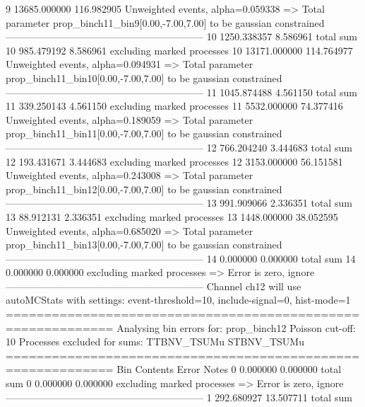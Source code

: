 9          13685.000000    116.982905      Unweighted events, alpha=0.059338
  => Total parameter prop_binch11_bin9[0.00,-7.00,7.00] to be gaussian constrained
------------------------------------------------------------
10         1250.338357     8.586961        total sum                     
10         985.479192      8.586961        excluding marked processes    
10         13171.000000    114.764977      Unweighted events, alpha=0.094931
  => Total parameter prop_binch11_bin10[0.00,-7.00,7.00] to be gaussian constrained
------------------------------------------------------------
11         1045.874488     4.561150        total sum                     
11         339.250143      4.561150        excluding marked processes    
11         5532.000000     74.377416       Unweighted events, alpha=0.189059
  => Total parameter prop_binch11_bin11[0.00,-7.00,7.00] to be gaussian constrained
------------------------------------------------------------
12         766.204240      3.444683        total sum                     
12         193.431671      3.444683        excluding marked processes    
12         3153.000000     56.151581       Unweighted events, alpha=0.243008
  => Total parameter prop_binch11_bin12[0.00,-7.00,7.00] to be gaussian constrained
------------------------------------------------------------
13         991.909066      2.336351        total sum                     
13         88.912131       2.336351        excluding marked processes    
13         1448.000000     38.052595       Unweighted events, alpha=0.685020
  => Total parameter prop_binch11_bin13[0.00,-7.00,7.00] to be gaussian constrained
------------------------------------------------------------
14         0.000000        0.000000        total sum                     
14         0.000000        0.000000        excluding marked processes    
  => Error is zero, ignore      
------------------------------------------------------------
Channel ch12 will use autoMCStats with settings: event-threshold=10, include-signal=0, hist-mode=1
============================================================
Analysing bin errors for: prop_binch12
Poisson cut-off: 10
Processes excluded for sums: TTBNV_TSUMu STBNV_TSUMu
============================================================
Bin        Contents        Error           Notes                         
0          0.000000        0.000000        total sum                     
0          0.000000        0.000000        excluding marked processes    
  => Error is zero, ignore      
------------------------------------------------------------
1          292.680927      13.507711       total sum                     
